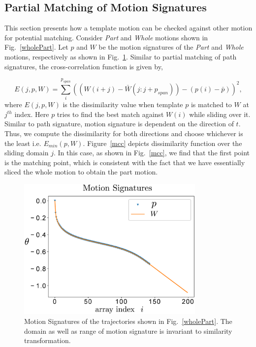 \documentclass[twocolumn,10pt]{asme2e}
\begin{document}
\subsection{Partial Matching of Motion Signatures}\label{sec_mcc}
This section presents how a template motion can be checked against other motion for potential matching.
Consider \emph{Part} and \emph{Whole} motions shown in Fig.~\ref{wholePart}.
Let $p$ and $W$ be the motion signatures of the \emph{Part} and \emph{Whole} motions, respectively as shown in Fig.~\ref{motionSignature}.
Similar to partial matching of path signatures, the cross-correlation function is given by,

\begin{equation}\label{mccEq}
  E(j, p, W) = \sum_{i}^{p_{span}} {((W(i+j) - \bar{W}(j: j + p_{span})) - (p(i) - \bar{p}))}^2,
\end{equation}
where $E(j, p, W)$ is the dissimilarity value when template $p$ is matched to $W$ at $j^{th}$ index. Here $p$ tries to find the best match against $W(i)$ while sliding over it.
Similar to path signature, motion signature is dependent on the direction of $t$. Thus, we compute the dissimilarity for both directions and choose whichever is the least i.e. $E_{min}(p, W)$.
Figure~\ref{mcc} depicts dissimilarity function over the sliding domain $j$.
In this case, as shown in Fig.~\ref{mcc}, we find that the first point is the matching point, which is consistent with the fact that we have essentially sliced the whole motion to obtain the part motion.

\begin{figure}
\centering
\includegraphics[width=260pt]{figure/fig_motion_signatures.eps}
  \caption{Motion Signatures of the trajectories shown in Fig.~\ref{wholePart}. The domain as well as range of motion signature is invariant to similarity transformation.}
\label{motionSignature}
\end{figure}
\end{document}
